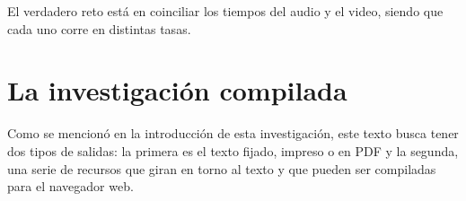 El verdadero reto está en coinciliar los tiempos del audio y el video, siendo que cada uno corre en distintas tasas.

\section{La investigación compilada}

Como se mencionó en la introducción de esta investigación, este texto busca tener dos tipos de salidas: la primera es el texto fijado, impreso o en PDF y la segunda, una serie de recursos que giran en torno al texto y que pueden ser compiladas para el navegador web. 

